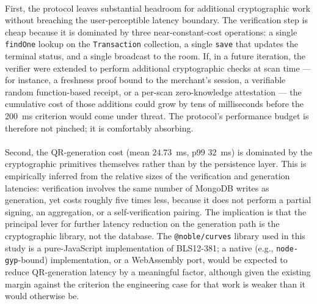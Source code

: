 \paragraph{}First, the protocol leaves substantial headroom for additional cryptographic work without breaching the user-perceptible latency boundary. The verification step is cheap because it is dominated by three near-constant-cost operations: a single \texttt{findOne} lookup on the \texttt{Transaction} collection, a single \texttt{save} that updates the terminal status, and a single broadcast to the room. If, in a future iteration, the verifier were extended to perform additional cryptographic checks at scan time --- for instance, a freshness proof bound to the merchant's session, a verifiable random function-based receipt, or a per-scan zero-knowledge attestation --- the cumulative cost of those additions could grow by tens of milliseconds before the 200~ms criterion would come under threat. The protocol's performance budget is therefore not pinched; it is comfortably absorbing.

\paragraph{}Second, the QR-generation cost (mean $24.73$~ms, p99 $32$~ms) is dominated by the cryptographic primitives themselves rather than by the persistence layer. This is empirically inferred from the relative sizes of the verification and generation latencies: verification involves the same number of MongoDB writes as generation, yet costs roughly five times less, because it does not perform a partial signing, an aggregation, or a self-verification pairing. The implication is that the principal lever for further latency reduction on the generation path is the cryptographic library, not the database. The \texttt{@noble/curves} library used in this study is a pure-JavaScript implementation of BLS12-381; a native (e.g., \texttt{node-gyp}-bound) implementation, or a WebAssembly port, would be expected to reduce QR-generation latency by a meaningful factor, although given the existing margin against the criterion the engineering case for that work is weaker than it would otherwise be.

